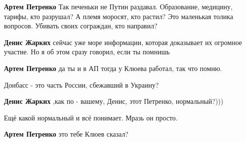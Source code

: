 \begin{itemize}
\begin{itemize}
\textbf{Артем Петренко} Так печеньки не Путин раздавал. Образование, медицину,
тарифы, кто разрушал? А племя моросят, кто растил? Это маленькая толика вопросов.
Убивать своих сограждан, кто направил?

 
\textbf{Денис Жарких} сейчас уже море информации, которая доказывает их огромное участие. Но я об этом сразу говорил, если ты помнишь

 
\textbf{Артем Петренко} да ты и в АП тогда у Клюева работал, так что помню.


Донбасс - это часть России, сбежавший в Украину?

 
\textbf{Денис Жарких} ,как по - вашему, Денис, этот Петренко, нормальный?)))

 
Ещё какой нормальный и всё понимает. Мразь он просто.

 
\textbf{Артем Петренко} это тебе Клюев сказал?

 

\end{itemize}
\end{itemize}
